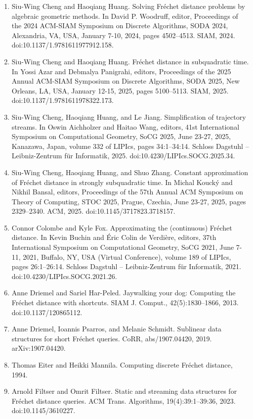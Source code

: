 \documentclass[10pt,a4paper]{article}
\begin{document}
\begin{enumerate}
\item[]  [14]  Siu-Wing Cheng and Haoqiang Huang.  Solving Fréchet distance problems by algebraic geometric methods.  In David P. Woodruff, editor, Proceedings of the 2024 ACM-SIAM Symposium on Discrete Algorithms, SODA 2024, Alexandria, VA, USA, January 7-10, 2024, pages 4502–4513. SIAM, 2024.  doi:10.1137/1.9781611977912.158.  
\item[]  [15]  Siu-Wing Cheng and Haoqiang Huang.  Fréchet distance in subquadratic time.  In Yossi Azar and Debmalya Panigrahi, editors, Proceedings of the 2025 Annual ACM-SIAM Symposium on Discrete Algorithms, SODA 2025, New Orleans, LA, USA, January 12-15, 2025, pages 5100–5113. SIAM, 2025.  doi:10.1137/1.9781611978322.173.  
\item[]  [16]  Siu-Wing Cheng, Haoqiang Huang, and Le Jiang.  Simplification of trajectory streams.  In Oswin Aichholzer and Haitao Wang, editors, 41st International Symposium on Computational Geometry, SoCG 2025, June 23-27, 2025, Kanazawa, Japan, volume 332 of LIPIcs, pages 34:1–34:14. Schloss Dagstuhl – Leibniz-Zentrum für Informatik, 2025.  doi:10.4230/LIPIcs.SOCG.2025.34.  
\item[]  [17]  Siu-Wing Cheng, Haoqiang Huang, and Shuo Zhang.  Constant approximation of Fréchet distance in strongly subquadratic time.  In Michal Koucký and Nikhil Bansal, editors, Proceedings of the 57th Annual ACM Symposium on Theory of Computing, STOC 2025, Prague, Czechia, June 23-27, 2025, pages 2329–2340. ACM, 2025.  doi:10.1145/3717823.3718157.  
\item[]  [18]  Connor Colombe and Kyle Fox.  Approximating the (continuous) Fréchet distance.  In Kevin Buchin and Éric Colin de Verdière, editors, 37th International Symposium on Computational Geometry, SoCG 2021, June 7-11, 2021, Buffalo, NY, USA (Virtual Conference), volume 189 of LIPIcs, pages 26:1–26:14. Schloss Dagstuhl – Leibniz-Zentrum für Informatik, 2021.  doi:10.4230/LIPIcs.SOCG.2021.26.  
\item[]  [19]  Anne Driemel and Sariel Har-Peled.  Jaywalking your dog: Computing the Fréchet distance with shortcuts.  SIAM J. Comput., 42(5):1830–1866, 2013.  doi:10.1137/120865112.  
\item[]  [20]  Anne Driemel, Ioannis Psarros, and Melanie Schmidt.  Sublinear data structures for short Fréchet queries.  CoRR, abs/1907.04420, 2019.  arXiv:1907.04420.  
\item[]  [21]  Thomas Eiter and Heikki Mannila.  Computing discrete Fréchet distance, 1994.  
\item[]  [22]  Arnold Filtser and Omrit Filtser.  Static and streaming data structures for Fréchet distance queries.  ACM Trans. Algorithms, 19(4):39:1–39:36, 2023.  doi:10.1145/3610227.  

\end{enumerate}
\end{document}
